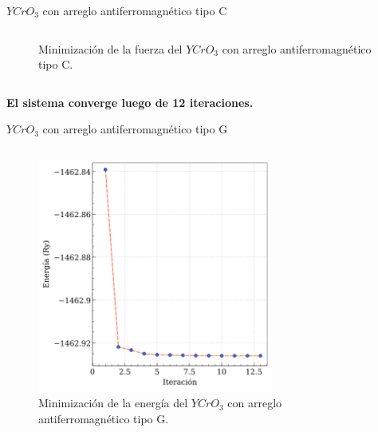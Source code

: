 \begin{frame}{$YCrO_{3}$ con arreglo antiferromagn\'etico tipo C}
\begin{columns}[t]
\begin{figure}[H]
            \caption{Minimizaci\'on de la fuerza del $YCrO_{3}$ con arreglo 
                antiferromagn\'etico tipo C.}
        \end{figure}
    \end{columns}
\centering
\textbf{El sistema converge luego de 12 iteraciones.}
\end{frame}


\begin{frame}{$YCrO_{3}$ con arreglo antiferromagn\'etico tipo G}
    \begin{columns}[t]
        \begin{figure}[H]
            \centering
            \includegraphics[width=0.9\textwidth]{contenido/resultados/img_resultados/energia_YCO_G.png}
            \caption{Minimizaci\'on de la energ\'ia del $YCrO_{3}$ con arreglo 
                antiferromagn\'etico tipo G.}
        \end{figure}
        \begin{figure}[H]
            \centering

\end{figure}
\end{columns}
\end{frame}
